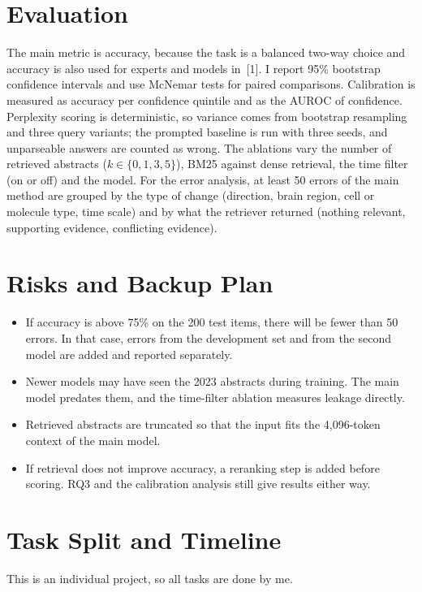 \documentclass[10pt,a4paper]{article}
\begin{document}
\section{Evaluation}
The main metric is accuracy, because the task is a balanced two-way choice and accuracy is also used for experts and models in~[1]. I report 95\% bootstrap confidence intervals and use McNemar tests for paired comparisons. Calibration is measured as accuracy per confidence quintile and as the AUROC of confidence. Perplexity scoring is deterministic, so variance comes from bootstrap resampling and three query variants; the prompted baseline is run with three seeds, and unparseable answers are counted as wrong. The ablations vary the number of retrieved abstracts ($k \in \{0,1,3,5\}$), BM25 against dense retrieval, the time filter (on or off) and the model. For the error analysis, at least 50 errors of the main method are grouped by the type of change (direction, brain region, cell or molecule type, time scale) and by what the retriever returned (nothing relevant, supporting evidence, conflicting evidence).

\section{Risks and Backup Plan}
\begin{itemize}
\item If accuracy is above 75\% on the 200 test items, there will be fewer than 50 errors. In that case, errors from the development set and from the second model are added and reported separately.
\item Newer models may have seen the 2023 abstracts during training. The main model predates them, and the time-filter ablation measures leakage directly.
\item Retrieved abstracts are truncated so that the input fits the 4,096-token context of the main model.
\item If retrieval does not improve accuracy, a reranking step is added before scoring. RQ3 and the calibration analysis still give results either way.
\end{itemize}

\section{Task Split and Timeline}
This is an individual project, so all tasks are done by me.
\end{document}
